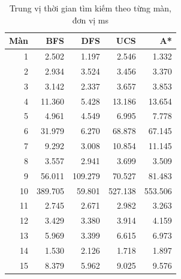 \begin{table}[htbp]
\centering
\small
\caption{Trung vị thời gian tìm kiếm theo từng màn, đơn vị ms}
\begin{tabular}{|r|r|r|r|r|}
\hline
Màn & BFS & DFS & UCS & A* \\\hline
1  & 2.502   & 1.197   & 2.546   & 1.332   \\\hline
2  & 2.934   & 3.524   & 3.456   & 3.370   \\\hline
3  & 3.142   & 2.337   & 3.657   & 3.853   \\\hline
4  & 11.360  & 5.428   & 13.186  & 13.654  \\\hline
5  & 4.961   & 4.549   & 6.995   & 7.778   \\\hline
6  & 31.979  & 6.270   & 68.878  & 67.145  \\\hline
7  & 9.292   & 3.008   & 10.854  & 11.145  \\\hline
8  & 3.557   & 2.941   & 3.699   & 3.509   \\\hline
9  & 56.011  & 109.279 & 70.527  & 81.483  \\\hline
10 & 389.705 & 59.801  & 527.138 & 553.506 \\\hline
11 & 2.745   & 2.671   & 2.982   & 3.263   \\\hline
12 & 3.429   & 3.380   & 3.914   & 4.159   \\\hline
13 & 5.969   & 3.399   & 6.615   & 6.973   \\\hline
14 & 1.530   & 2.126   & 1.718   & 1.897   \\\hline
15 & 8.379   & 5.962   & 9.025   & 9.576   \\\hline
\end{tabular}
\end{table}

\clearpage

